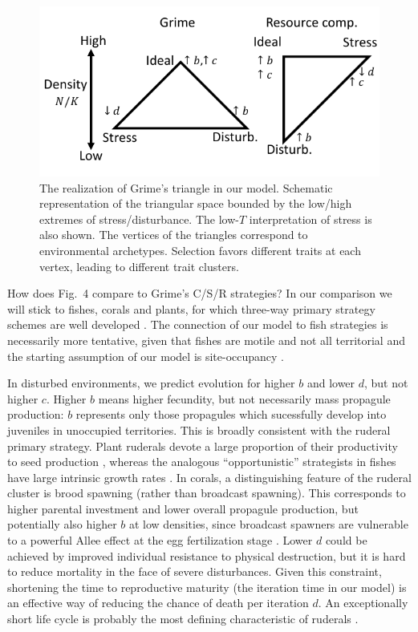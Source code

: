 \documentclass[11pt]{article}
\begin{document}
\begin{figure}
\centering
\includegraphics[scale=1]{axes.pdf}
\caption{\label{fig:axes} The realization of Grime's triangle in our model. Schematic representation of the triangular space bounded by the low/high extremes of stress/disturbance. The low-$T$ interpretation of stress is also shown. The vertices of the triangles correspond to environmental archetypes. Selection favors different traits at each vertex, leading to different trait clusters.} 
\end{figure}

How does Fig.~4 compare to Grime's C/S/R strategies? In our comparison we will stick to fishes, corals and plants, for which three-way primary strategy schemes are well developed \citep{grime_1977,winemiller_1992,darling_2012}. The connection of our model to fish strategies is necessarily more tentative, given that fishes are motile and not all territorial and the starting assumption of our model is site-occupancy . 

In disturbed environments, we predict evolution for higher $b$ and lower $d$, but not higher $c$. Higher $b$ means higher fecundity, but not necessarily mass propagule production: $b$ represents only those propagules which sucessfully develop into juveniles in unoccupied territories. This is broadly consistent with the ruderal primary strategy. Plant ruderals devote a large proportion of their productivity to seed production \cite{grime_1977}, whereas the analogous ``opportunistic'' strategists in fishes have large intrinsic growth rates \citep{winemiller_1992}. In corals, a distinguishing feature of the ruderal cluster is brood spawning (rather than broadcast spawning). This corresponds to higher parental investment and lower overall propagule production, but potentially also higher $b$ at low densities, since broadcast spawners are vulnerable to a powerful Allee effect at the egg fertilization stage \citep{knowlton_2001}. Lower $d$ could be achieved by improved individual resistance to physical destruction, but it is hard to reduce mortality in the face of severe disturbances. Given this constraint, shortening the time to reproductive maturity (the iteration time in our model) is an effective way of reducing the chance of death per iteration $d$. An exceptionally short life cycle is probably the most defining characteristic of ruderals \citep{grime_1977,winemiller_1992,darling_2012}.
\end{document}
